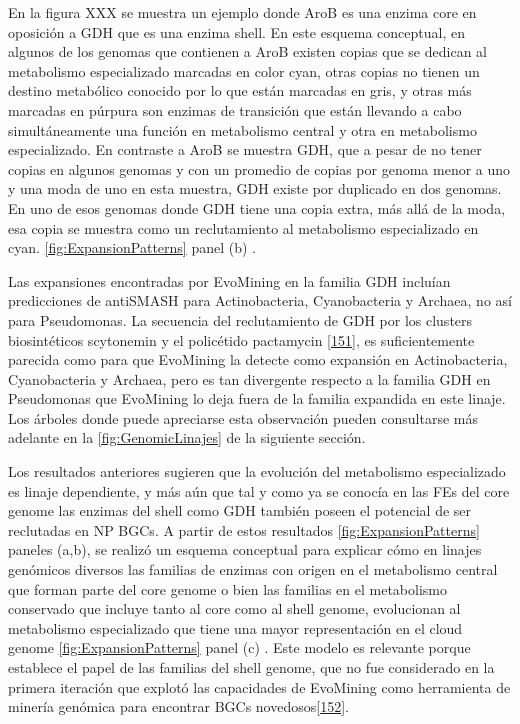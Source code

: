 \documentclass[12pt,twoside]{reedthesis}
\begin{document}
  En la figura XXX se muestra un ejemplo donde AroB es una enzima core en
  oposición a GDH que es una enzima shell. En este esquema conceptual, en
  algunos de los genomas que contienen a AroB existen copias que se
  dedican al metabolismo especializado marcadas en color cyan, otras
  copias no tienen un destino metabólico conocido por lo que están
  marcadas en gris, y otras más marcadas en púrpura son enzimas de
  transición que están llevando a cabo simultáneamente una función en
  metabolismo central y otra en metabolismo especializado. En contraste a
  AroB se muestra GDH, que a pesar de no tener copias en algunos genomas y
  con un promedio de copias por genoma menor a uno y una moda de uno en
  esta muestra, GDH existe por duplicado en dos genomas. En uno de esos
  genomas donde GDH tiene una copia extra, más allá de la moda, esa copia
  se muestra como un reclutamiento al metabolismo especializado en cyan.
  \autoref{fig:ExpansionPatterns} panel (b) .
  
  Las expansiones encontradas por EvoMining en la familia GDH incluían
  predicciones de antiSMASH para Actinobacteria, Cyanobacteria y Archaea,
  no así para Pseudomonas. La secuencia del reclutamiento de GDH por los
  clusters biosintéticos scytonemin y el policétido pactamycin
  {[}\protect\hyperlink{ref-kudo_cloning_2007}{151}{]}, es suficientemente
  parecida como para que EvoMining la detecte como expansión en
  Actinobacteria, Cyanobacteria y Archaea, pero es tan divergente respecto
  a la familia GDH en Pseudomonas que EvoMining lo deja fuera de la
  familia expandida en este linaje. Los árboles donde puede apreciarse
  esta observación pueden consultarse más adelante en la
  \autoref{fig:GenomicLinajes} de la siguiente sección.
  
  Los resultados anteriores sugieren que la evolución del metabolismo
  especializado es linaje dependiente, y más aún que tal y como ya se
  conocía en las FEs del core genome las enzimas del shell como GDH
  también poseen el potencial de ser reclutadas en NP BGCs. A partir de
  estos resultados \autoref{fig:ExpansionPatterns} paneles (a,b), se
  realizó un esquema conceptual para explicar cómo en linajes genómicos
  diversos las familias de enzimas con origen en el metabolismo central
  que forman parte del core genome o bien las familias en el metabolismo
  conservado que incluye tanto al core como al shell genome, evolucionan
  al metabolismo especializado que tiene una mayor representación en el
  cloud genome \autoref{fig:ExpansionPatterns} panel (c) . Este modelo es
  relevante porque establece el papel de las familias del shell genome,
  que no fue considerado en la primera iteración que explotó las
  capacidades de EvoMining como herramienta de minería genómica para
  encontrar BGCs
  novedosos{[}\protect\hyperlink{ref-navarro-munoz_computational_2018}{152}{]}.
  
\end{document}
